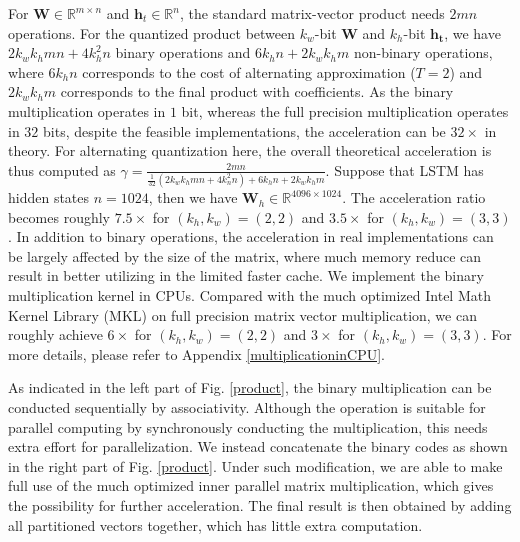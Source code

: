 \documentclass{article} %
\newcommand{\W}{\mathbf{W}}
\newcommand{\<}{\left\langle}
\renewcommand{\>}{\right\rangle}
\begin{document}
For $\W \in \mathbb{R}^{m \times n}$ and $\mathbf{h}_t \in \mathbb{R}^{n}$, the standard matrix-vector product needs $2mn$ operations.  For the quantized product between $k_w$-bit $\W$ and $k_h$-bit $\mathbf{h_t}$, we have $2k_wk_hmn + 4k_h^2n$ binary operations and $6k_hn + 2 k_wk_hm$ non-binary operations, where $6k_hn$ corresponds to the cost of alternating approximation ($T= 2$) and $2 k_wk_hm$ corresponds to the final product with coefficients. As the binary multiplication operates in $1$ bit, whereas the full precision multiplication operates in $32$ bits, despite the feasible implementations, the acceleration can be $32\times$ in theory. For alternating quantization here, the overall theoretical acceleration is thus  computed as $\gamma = \frac{2mn}{\frac{1}{32}(2k_wk_hmn + 4k_n^2n) + 6k_hn + 2 k_wk_hm}$.
Suppose that LSTM has hidden states $n = 1024$, then we have $\W_h \in \mathbb{R}^{4096 \times 1024}$. The acceleration ratio becomes roughly $7.5 \times $ for $(k_h,k_w) = (2,2)$ and $ 3.5 \times$ for $(k_h, k_w) = (3,3)$.  In addition to binary operations, the acceleration in real implementations can be largely affected by the size of the matrix, where much memory reduce can result in better utilizing in the limited faster cache. We implement the binary multiplication kernel in CPUs. Compared with  the much optimized Intel Math Kernel Library (MKL) on full precision matrix vector multiplication, we can roughly achieve $6 \times $ for $(k_h,k_w) = (2,2)$ and $3 \times$ for $(k_h, k_w) = (3,3)$. For more details, please refer to Appendix \ref{multiplicationinCPU}. 


As indicated in the left part of Fig. \ref{product}, the binary multiplication can be conducted sequentially by associativity. Although the operation is suitable for parallel computing by synchronously conducting the multiplication, this needs extra effort for parallelization. We instead concatenate the binary codes as shown in the right part of Fig. \ref{product}. Under such modification, we are able to make full use of the much optimized inner parallel matrix multiplication, which gives the possibility for further acceleration. The final result is then obtained by adding all partitioned vectors together, which has little extra computation. 
\end{document}
